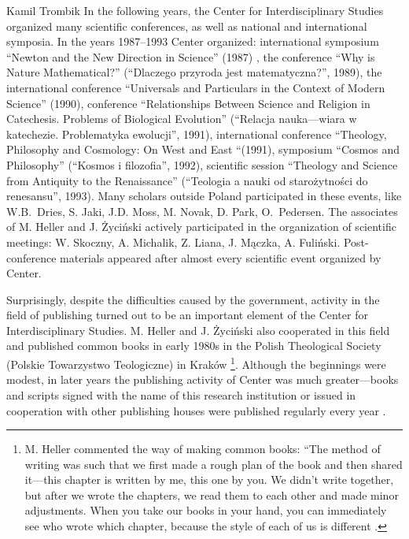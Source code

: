 \begin{artengenv}{Kamil Trombik}
In the following years, the Center for Interdisciplinary Studies organized many scientific conferences, as well as
national and international symposia. In the years 1987--1993 Center organized: international symposium ``Newton and the
New Direction in Science'' (1987) , the conference ``Why is Nature Mathematical?'' (``Dlaczego przyroda jest
matematyczna?'', 1989), the international conference ``Universals and Particulars in the Context of Modern Science''
(1990), conference ``Relationships Between Science and Religion in Catechesis. Problems of Biological Evolution''
(``Relacja nauka---wiara w katechezie. Problematyka ewolucji'', 1991), international conference ``Theology, Philosophy and
Cosmology: On West and East ``(1991), symposium ``Cosmos and Philosophy'' (``Kosmos i filozofia'', 1992), scientific session
``Theology and Science from Antiquity to the Renaissance'' (``Teologia a nauki od starożytności do renesansu'', 1993). Many
scholars outside Poland participated in these events, like W.B.~Dries, S. Jaki, J.D. Moss, M. Novak, D. Park,
O.~Pedersen. The associates of M. Heller and J. Życiński actively participated in the organization of scientific meetings:
W. Skoczny, A. Michalik, Z. Liana, J. Mączka, A. Fuliński. Post-conference materials appeared after almost every
scientific event organized by Center.

Surprisingly, despite the difficulties caused by the government, activity in the field of publishing turned out to be
an important element of the Center for Interdisciplinary Studies. M. Heller and J. Życiński also cooperated in this
field and published common books in early 1980s in the Polish Theological Society (Polskie Towarzystwo Teologiczne) in
Kraków
\parencites{heller_wszechswiat_1980,heller_drogi_1983}\footnote{%
M. Heller commented the way of making
common books: ``The method of writing was such that we first made a rough plan of the book and then shared it---this
chapter is written by me, this one by you. We didn't write together, but after we wrote the chapters, we read them to
each other and made minor adjustments. When you take our books in your hand, you can immediately see who wrote which
chapter, because the style of each of us is different
\parencite[p.231]{heller_wierze_2016}.
}. Although
the beginnings were modest, in later years the publishing activity of Center was much greater---books and scripts signed
with the name of this research institution or issued in cooperation with other publishing houses were published
regularly every year
\parencite[e.g.][]{heller_filozofowac_1987,coyne_newton_1988,heller_matematycznosc_1990,%
	mcmullin_ewolucja_1990,heller_spor_1991,wolak_neotomizm_1993}.


\end{artengenv}

